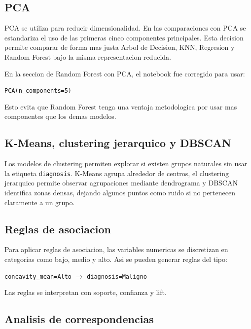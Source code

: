 \documentclass[12pt,letterpaper]{article}
\begin{document}
\subsection{PCA}

PCA se utiliza para reducir dimensionalidad. En las comparaciones con PCA se estandariza el uso de las primeras cinco componentes principales. Esta decision permite comparar de forma mas justa Arbol de Decision, KNN, Regresion y Random Forest bajo la misma representacion reducida.

En la seccion de Random Forest con PCA, el notebook fue corregido para usar:

\begin{center}
\texttt{PCA(n\_components=5)}
\end{center}

Esto evita que Random Forest tenga una ventaja metodologica por usar mas componentes que los demas modelos.

\subsection{K-Means, clustering jerarquico y DBSCAN}

Los modelos de clustering permiten explorar si existen grupos naturales sin usar la etiqueta \texttt{diagnosis}. K-Means agrupa alrededor de centros, el clustering jerarquico permite observar agrupaciones mediante dendrograma y DBSCAN identifica zonas densas, dejando algunos puntos como ruido si no pertenecen claramente a un grupo.

\subsection{Reglas de asociacion}

Para aplicar reglas de asociacion, las variables numericas se discretizan en categorias como bajo, medio y alto. Asi se pueden generar reglas del tipo:

\begin{center}
\texttt{concavity\_mean=Alto} $\rightarrow$ \texttt{diagnosis=Maligno}
\end{center}

Las reglas se interpretan con soporte, confianza y lift.

\subsection{Analisis de correspondencias}
\end{document}

